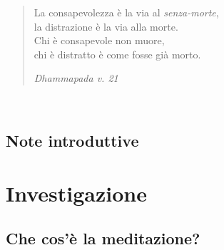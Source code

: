 \documentclass[11pt,twoside,final]{memoir}
\begin{document}
\cleartorecto
\thispagestyle{empty}
{\raggedleft\vspace*{5em}

\begin{minipage}{0.9\linewidth}
\raggedright

\begin{quote}
La consapevolezza è la via al \textit{senza-morte},\\
la distrazione è la via alla morte.\\
Chi è consapevole non muore,\\
chi è distratto è come fosse già morto.\\
\bigskip

{\small\textit{Dhammapada v. 21}}
\end{quote}

\end{minipage}

}


\mainmatter*


\newpage
\thispagestyle{empty}
\vspace*{8\baselineskip}
{\centering
\booktitlefont
\MakeUppercase{}\\
\MakeUppercase{}
\par
}
\vfil

\setcounter{chapter}{0}


\chapter{Note introduttive}



\part{Investigazione}

\chapter{Che cos'è la meditazione?}

\end{document}
